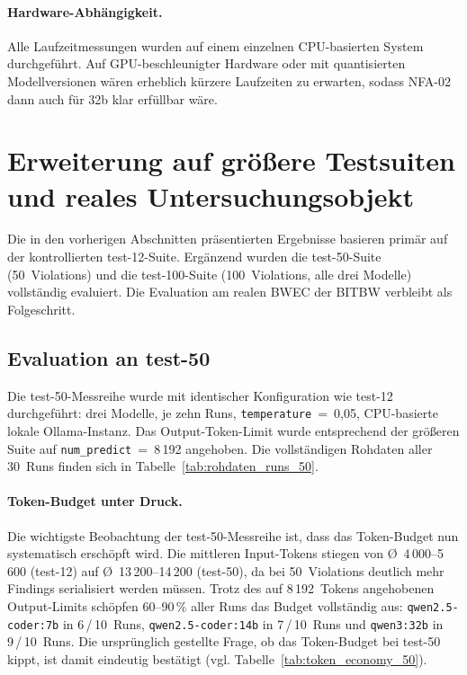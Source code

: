 \paragraph{Hardware-Abhängigkeit.}
Alle Laufzeitmessungen wurden auf einem einzelnen \ac{CPU}-basierten System durchgeführt. Auf \ac{GPU}-beschleunigter Hardware oder mit quantisierten Modellversionen wären erheblich kürzere Laufzeiten zu erwarten, sodass \ac{NFA}-02 dann auch für 32b klar erfüllbar wäre.

\section{Erweiterung auf größere Testsuiten und reales Untersuchungsobjekt}
\label{sec:eval_erweiterung}

Die in den vorherigen Abschnitten präsentierten Ergebnisse basieren primär auf der kontrollierten test-12-Suite. Ergänzend wurden die test-50-Suite (50~Violations) und die test-100-Suite (100~Violations, alle drei Modelle) vollständig evaluiert. Die Evaluation am realen \ac{BWEC} der \ac{BITBW} verbleibt als Folgeschritt.

\subsection{Evaluation an test-50}
\label{sec:eval_suiten}

Die test-50-Messreihe wurde mit identischer Konfiguration wie test-12 durchgeführt: drei Modelle, je zehn Runs, \texttt{temperature}~=~0{,}05, CPU-basierte lokale Ollama-Instanz. Das Output-Token-Limit wurde entsprechend der größeren Suite auf \texttt{num\_predict}~=~8\,192 angehoben. Die vollständigen Rohdaten aller 30~Runs finden sich in Tabelle~\ref{tab:rohdaten_runs_50}.

\paragraph{Token-Budget unter Druck.}
Die wichtigste Beobachtung der test-50-Messreihe ist, dass das Token-Budget nun systematisch erschöpft wird. Die mittleren Input-Tokens stiegen von \O{}~4\,000--5\,600 (test-12) auf \O{}~13\,200--14\,200 (test-50), da bei 50~Violations deutlich mehr Findings serialisiert werden müssen. Trotz des auf 8\,192~Tokens angehobenen Output-Limits schöpfen 60--90\,\% aller Runs das Budget vollständig aus: \texttt{qwen2.5-coder:7b} in 6\,/\,10~Runs, \texttt{qwen2.5-coder:14b} in 7\,/\,10~Runs und \texttt{qwen3:32b} in 9\,/\,10~Runs. Die ursprünglich gestellte Frage, ob das Token-Budget bei test-50 kippt, ist damit eindeutig bestätigt (vgl. Tabelle~\ref{tab:token_economy_50}).

